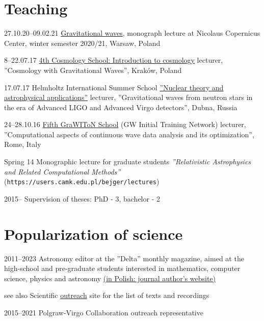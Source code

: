 \documentclass[]{friggeri-cv} %
\begin{document}
\section{Teaching}
\begin{entrylistshort}

\entrys
{27.10.20--09.02.21} 
{\href{https://users.camk.edu.pl/bejger/gw-lecture2020}{Gravitational waves}, monograph lecture at Nicolaus Copernicus Center, winter semester 2020/21, Warsaw, Poland} 

\entrys
{8--22.07.17}
{\href{http://cosmoschool2018.oa.uj.edu.pl}{4th Cosmology School: Introduction to cosmology} lecturer, ''Cosmology with Gravitational Waves'', Kraków, Poland}

\entrys
{17.07.17} 
{Helmholtz International Summer School \href{http://theor.jinr.ru/~ntaa/17}{''Nuclear theory and astrophysical applications''} lecturer, ''Gravitational waves from neutron stars in the era of Advanced LIGO and Advanced Virgo detectors'', Dubna, Russia}  

\entrys
{24--28.10.16}
{\href{https://events.ego-gw.it/indico/conferenceDisplay.py?ovw=True\&confId=44}{Fifth GraWIToN School} (GW Initial Training Network) lecturer, ''Computational aspects of continuous wave data analysis and its optimization'', Rome, Italy}

\entrys
{Spring 14}
{Monographic lecture for graduate students {\it ''Relativistic Astrophysics and Related Computational Methods''} ({\tt https://users.camk.edu.pl/bejger/lectures})} 


\entrys
{2015--} 
{Supervision of theses: PhD - 3, bachelor - 2} 
\end{entrylistshort}



\section{Popularization of science}
\begin{entrylistshort}

\entrys 
{2011--2023} 
{Astronomy editor at the ''Delta'' monthly magazine, aimed at the high-school and pre-graduate students interested in mathematics, computer science, physics and astronomy \href{http://www.deltami.edu.pl/delta/autorzy/michal\_bejger}{(in Polish: journal author's website)}} 

\entrys
{see also} 
{Scientific \href{http://users.camk.edu.pl/bejger/outreach/}{outreach} site for the list of texts and recordings} 

\entrys
{2015--2021} 
{Polgraw-Virgo Collaboration outreach representative} 
\end{entrylistshort}
\end{document}
